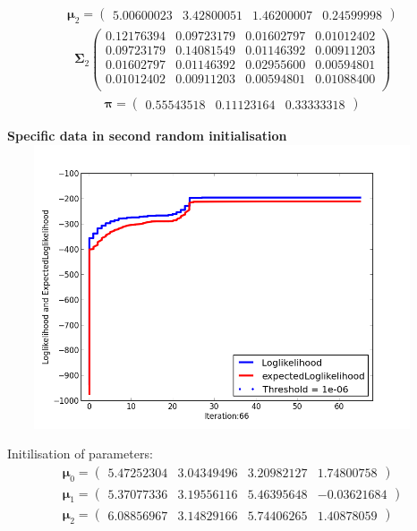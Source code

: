 \documentclass[11pt,a4paper]{article}
\newcommand{\htab}{\hspace*{0.63cm}}
\newcommand{\bs}[1]{\boldsymbol{#1}}
\begin{document}
\begin{align} \bs{\mu}_{2} = \begin{pmatrix} 
5.00600023 & 3.42800051 & 1.46200007 & 0.24599998 
 \end{pmatrix}  \end{align}\vspace{-1cm} 
\begin{align} \bs{\Sigma}_{2}\begin{pmatrix} 
0.12176394 & 0.09723179 & 0.01602797 & 0.01012402 \\ 
0.09723179 & 0.14081549 & 0.01146392 & 0.00911203 \\ 
0.01602797 & 0.01146392 & 0.02955600 & 0.00594801 \\ 
0.01012402 & 0.00911203 & 0.00594801 & 0.01088400 \\ 
\end{pmatrix} \end{align}
\begin{align}  \bs{\pi} = \begin{pmatrix}
    0.55543518 & 0.11123164 & 0.33333318
\end{pmatrix} \end{align}
\newpage
\begin{center}
    \textbf{Specific data in second random initialisation}
    \includegraphics[width=5in,height=3.3in]{./Result/figure_2.png}
\end{center}
\htab Initilisation of parameters:
\begin{align} 
    \bs{\mu}_{0} = \begin{pmatrix} 
        5.47252304 & 3.04349496 & 3.20982127 & 1.74800758 
    \end{pmatrix}   \\
    \bs{\mu}_{1} = \begin{pmatrix} 
        5.37077336 & 3.19556116 & 5.46395648 & -0.03621684 
    \end{pmatrix}    \\
    \bs{\mu}_{2} = \begin{pmatrix} 
        6.08856967 & 3.14829166 & 5.74406265 & 1.40878059
    \end{pmatrix}  \end{align} \vspace{-1cm}
\end{document}
